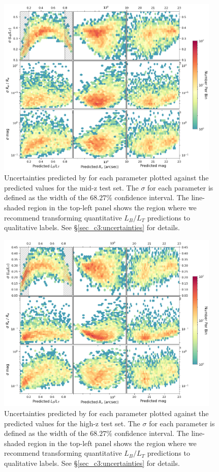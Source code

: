 \begin{figure}[htb]
    \centering
    \includegraphics[width = 0.95\textwidth]{2d_uncer_mid_z.png}
    \caption{Uncertainties predicted by \gampen{} for each parameter plotted against the predicted values for the mid-z test set. The $\sigma$ for each parameter is defined as the width of the $68.27\%$ confidence interval. The line-shaded region in the top-left panel shows the region where we recommend transforming quantitative $L_B/L_T$ predictions to qualitative labels. See \S \ref{sec_c3:uncertainties} for details.}
    \label{fig_c3:2d_uncer_mid_z}
\end{figure}

\begin{figure}[htb]
    \centering
    \includegraphics[width = 0.95\textwidth]{2d_uncer_high_z.png}
    \caption{Uncertainties predicted by \gampen{} for each parameter plotted against the predicted values for the high-z test set. The $\sigma$ for each parameter is defined as the width of the $68.27\%$ confidence interval. The line-shaded region in the top-left panel shows the region where we recommend transforming quantitative $L_B/L_T$ predictions to qualitative labels. See \S \ref{sec_c3:uncertainties} for details.}
    \label{fig_c3:2d_uncer_high_z}
\end{figure}

